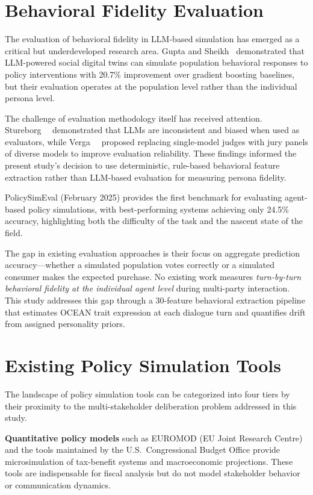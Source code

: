 \section{Behavioral Fidelity Evaluation}

The evaluation of behavioral fidelity in LLM-based simulation has emerged as a critical but underdeveloped research area. Gupta and Sheikh~\cite{gupta2026digital} demonstrated that LLM-powered social digital twins can simulate population behavioral responses to policy interventions with 20.7\% improvement over gradient boosting baselines, but their evaluation operates at the population level rather than the individual persona level.

The challenge of evaluation methodology itself has received attention. Stureborg~\etal~\cite{stureborg2024inconsistent} demonstrated that LLMs are inconsistent and biased when used as evaluators, while Verga~\etal~\cite{verga2024jury} proposed replacing single-model judges with jury panels of diverse models to improve evaluation reliability. These findings informed the present study's decision to use deterministic, rule-based behavioral feature extraction rather than LLM-based evaluation for measuring persona fidelity.

PolicySimEval (February 2025) provides the first benchmark for evaluating agent-based policy simulations, with best-performing systems achieving only 24.5\% accuracy, highlighting both the difficulty of the task and the nascent state of the field.

The gap in existing evaluation approaches is their focus on aggregate prediction accuracy---whether a simulated population votes correctly or a simulated consumer makes the expected purchase. No existing work measures \textit{turn-by-turn behavioral fidelity at the individual agent level} during multi-party interaction. This study addresses this gap through a 30-feature behavioral extraction pipeline that estimates OCEAN trait expression at each dialogue turn and quantifies drift from assigned personality priors.


\section{Existing Policy Simulation Tools}

The landscape of policy simulation tools can be categorized into four tiers by their proximity to the multi-stakeholder deliberation problem addressed in this study.

\textbf{Quantitative policy models} such as EUROMOD (EU Joint Research Centre) and the tools maintained by the U.S.\ Congressional Budget Office provide microsimulation of tax-benefit systems and macroeconomic projections. These tools are indispensable for fiscal analysis but do not model stakeholder behavior or communication dynamics.

